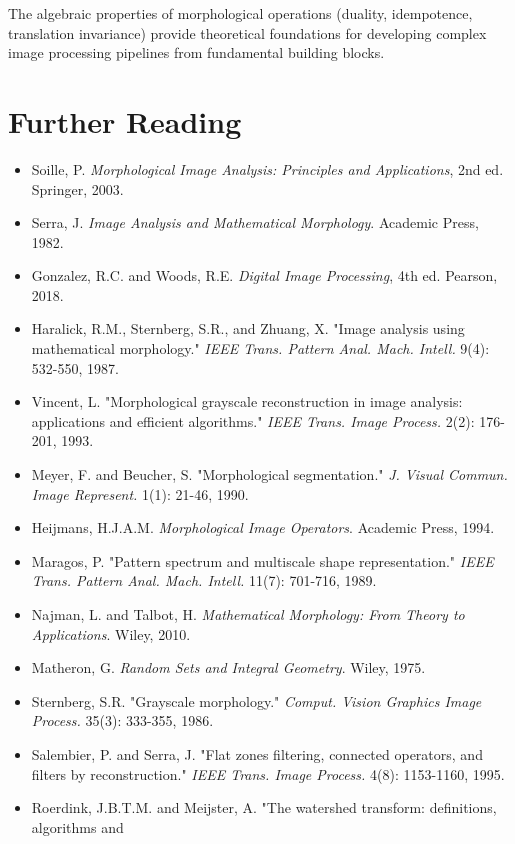 \documentclass[a4paper, 11pt]{article}
\begin{document}
The algebraic properties of morphological operations (duality, idempotence, translation invariance)
provide theoretical foundations for developing complex image processing pipelines from fundamental
building blocks.

\section*{Further Reading}

\begin{itemize}
\item Soille, P. \textit{Morphological Image Analysis: Principles and Applications}, 2nd ed.
Springer, 2003.
\item Serra, J. \textit{Image Analysis and Mathematical Morphology}. Academic Press, 1982.
\item Gonzalez, R.C. and Woods, R.E. \textit{Digital Image Processing}, 4th ed. Pearson, 2018.
\item Haralick, R.M., Sternberg, S.R., and Zhuang, X. "Image analysis using mathematical morphology."
\textit{IEEE Trans. Pattern Anal. Mach. Intell.} 9(4): 532-550, 1987.
\item Vincent, L. "Morphological grayscale reconstruction in image analysis: applications and
efficient algorithms." \textit{IEEE Trans. Image Process.} 2(2): 176-201, 1993.
\item Meyer, F. and Beucher, S. "Morphological segmentation." \textit{J. Visual Commun. Image
Represent.} 1(1): 21-46, 1990.
\item Heijmans, H.J.A.M. \textit{Morphological Image Operators}. Academic Press, 1994.
\item Maragos, P. "Pattern spectrum and multiscale shape representation." \textit{IEEE Trans.
Pattern Anal. Mach. Intell.} 11(7): 701-716, 1989.
\item Najman, L. and Talbot, H. \textit{Mathematical Morphology: From Theory to Applications}.
Wiley, 2010.
\item Matheron, G. \textit{Random Sets and Integral Geometry}. Wiley, 1975.
\item Sternberg, S.R. "Grayscale morphology." \textit{Comput. Vision Graphics Image Process.}
35(3): 333-355, 1986.
\item Salembier, P. and Serra, J. "Flat zones filtering, connected operators, and filters by
reconstruction." \textit{IEEE Trans. Image Process.} 4(8): 1153-1160, 1995.
\item Roerdink, J.B.T.M. and Meijster, A. "The watershed transform: definitions, algorithms and

\end{itemize}
\end{document}
